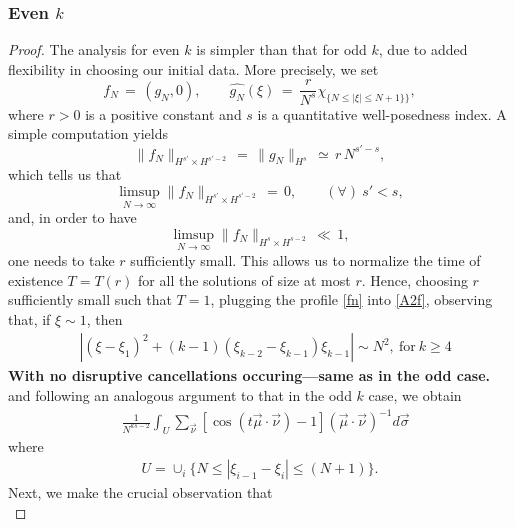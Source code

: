 \documentclass{amsart}
\begin{document}
\subsubsection{Even $k$} 
\begin{proof}
The analysis for even $k$ is simpler than that for odd $k$, due to added flexibility in choosing our initial data. More precisely, we set \begin{equation}
f_N\,=\,(g_N, 0), \qquad \widehat{g_N}(\xi)\,=\,\frac{r}{N^s} \chi_{\{N \leq |\xi| \leq N + 1\}\}},
\label{fn1}
\end{equation}
where $r>0$ is a positive constant and $s$ is a quantitative well-posedness index. A simple computation yields
\begin{equation}
\|f_N\|_{H^{s'}\times H^{s'-2}}\,=\,\|g_N\|_{H^s}\,\simeq\,r\,N^{s'-s},
\label{hsfn}
\end{equation}
which tells us that
\[
\limsup_{N\to \infty} \|f_N\|_{H^{s'} \times H^{s' -2}}\,=\,0, \qquad (\forall)\ s'<s, 
\]
and, in order to have 
\[
\limsup_{N\to \infty} \|f_N\|_{H^s \times H^{s -2}}\,\ll\,1,
\]
one needs to take $r$ sufficiently small. This allows us to normalize the time of existence $T=T(r)$ for all the solutions of size at most $r$.
Hence, choosing $r$ sufficiently small such that $T=1$, plugging the profile \eqref{fn} into \eqref{A2f}, 
observing that, if $\xi \sim 1$, then
\begin{equation}
\begin{split}
& 
|(\xi - \xi_{1})^{2} + (k-1)(\xi_{k-2} - \xi_{k-1})\xi_{k-1}|
\sim 
  N^{2}, \ \text{for} \ k \ge 4
\end{split}
\end{equation}
\textbf{With no disruptive cancellations occuring---same as in the odd case.}
and following an analogous argument to that in the odd $k$ case, we obtain
\begin{equation}
  \begin{split}
   & \frac{1}{N^{ks-2}}  \int_{U}
        \sum_{\vec{\nu}}  [\cos(t \vec{\mu} \cdot \vec{\nu}) -1] (\vec{\mu} \cdot \vec{\nu})^{-1}
    d \vec{\sigma}
      \end{split}
\end{equation}
where
\begin{equation*}
\begin{split}
U = \cup_{i}\{N \leq |\xi_{i-1}-\xi_{i}|\leq (N+1) \}.
\end{split}
\end{equation*}
Next, we make the crucial observation that
\begin{equation*}

\end{equation*}
\end{proof}
\end{document}
